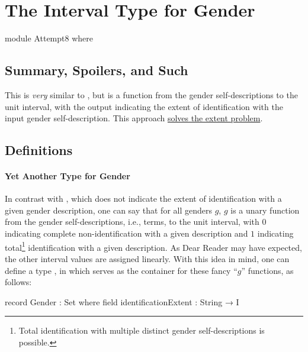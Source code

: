 \documentclass{article}
\theoremstyle{remark}
\newcommand{\summaryLink}[2]{\hyperref[#1]{#2}}
\begin{document}
\section{The Interval Type for Gender}

\begin{code}
module Attempt8 where
\end{code}

\subsection{Summary, Spoilers, and Such}
This  is \emph{very} similar to \hyperref[sec:gender7]{}, but  is a function from the gender self-descriptions to the unit interval, with the output indicating the extent of identification with the input gender self-description.  This approach \summaryLink{enum:gender8advantageExtent}{solves the extent problem}.

\subsection{Definitions}

\paragraph{Yet Another Type for Gender}
In contrast with , which does not indicate the extent of identification with a given gender description, one can say that for all genders \(g\), \(g\) is a unary function from the gender self-descriptions, i.e.,  terms, to the unit interval, with \(0\) indicating complete non-identification with a given description and \(1\) indicating total\footnote{Total identification with multiple distinct gender self-descriptions is possible.} identification with a given description.  As Dear Reader may have expected, the other interval values are assigned linearly.  With this idea in mind, one can define a type , in which  serves as the container for these fancy ``\(g\)'' functions, as follows:

\begin{code}
  record Gender : Set where
    field
      identificationExtent : String → I
\end{code}
\end{document}
